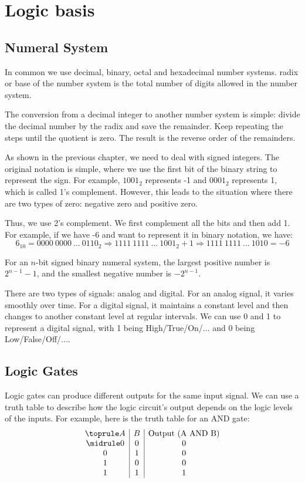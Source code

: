 \chapter{Logic basis}
\section{Numeral System}
In common we use decimal, binary, octal and hexadecimal number systems. radix or base of the number system is the total number of digits allowed in the number system. 

The conversion from a decimal integer to another number system is simple: divide the decimal number by the radix and save the remainder. Keep repeating the steps until the quotient is zero. The result is the reverse order of the remainders.

As shown in the previous chapter, we need to deal with signed integers. The original notation is simple, where we use the first bit of the binary string to represent the sign. For example, \(1001_2\) represents -1 and \(0001_2\) represents 1, which is called 1's complement. However, this leads to the situation where there are two types of zero: negative zero and positive zero. 

Thus, we use 2's complement. We first complement all the bits and then add 1. For example, if we have -6 and want to represent it in binary notation, we have:
\[
  6_{10} = 0000\ 0000\ ...\ 0110_2 \Rightarrow 1111\ 1111\ ...\ 1001_2 + 1 \Rightarrow 1111\ 1111\ ...\ 1010 = -6
\]

For an \(n\)-bit signed binary numeral system, the largest positive number is \(2^{n-1} - 1\), and the smallest negative number is \(-2^{n-1}\).

There are two types of signals: analog and digital. For an analog signal, it varies smoothly over time. For a digital signal, it maintains a constant level and then changes to another constant level at regular intervals. We can use 0 and 1 to represent a digital signal, with 1 being High/True/On/... and 0 being Low/False/Off/....

\section{Logic Gates}
Logic gates can produce different outputs for the same input signal. We can use a truth table to describe how the logic circuit's output depends on the logic levels of the inputs. For example, here is the truth table for an AND gate:
\[
\begin{array}{c|c|c}
  \toprule
  A & B & \text{Output (A AND B)} \\
  \midrule 
  0 & 0 & 0 \\
  0 & 1 & 0 \\
  1 & 0 & 0 \\
  1 & 1 & 1 \\
\end{array}
\]
